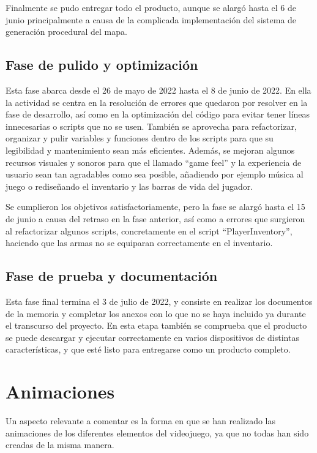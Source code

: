 Finalmente se pudo entregar todo el producto, aunque se alargó hasta el 6 de junio principalmente a causa de la complicada implementación del sistema de generación procedural del mapa.

\subsection{Fase de pulido y optimización}
Esta fase abarca desde el 26 de mayo de 2022 hasta el 8 de junio de 2022. En ella la actividad se centra en la resolución de errores que quedaron por resolver en la fase de desarrollo, así como en la optimización del código para evitar tener líneas innecesarias o scripts que no se usen. También se aprovecha para refactorizar, organizar y pulir variables y funciones dentro de los scripts para que su legibilidad y mantenimiento sean más eficientes. Además, se mejoran algunos recursos visuales y sonoros para que el llamado ``game feel'' y la experiencia de usuario sean tan agradables como sea posible, añadiendo por ejemplo música al juego o rediseñando el inventario y las barras de vida del jugador.

Se cumplieron los objetivos satisfactoriamente, pero la fase se alargó hasta el 15 de junio a causa del retraso en la fase anterior, así como a errores que surgieron al refactorizar algunos scripts, concretamente en el script ``PlayerInventory'', haciendo que las armas no se equiparan correctamente en el inventario.

\subsection{Fase de prueba y documentación}
Esta fase final termina el 3 de julio de 2022, y consiste en realizar los documentos de la memoria y completar los anexos con lo que no se haya incluido ya durante el transcurso del proyecto. En esta etapa también se comprueba que el producto se puede descargar y ejecutar correctamente en varios dispositivos de distintas características, y que esté listo para entregarse como un producto completo.

\section{Animaciones}
Un aspecto relevante a comentar es la forma en que se han realizado las animaciones de los diferentes elementos del videojuego, ya que no todas han sido creadas de la misma manera.

